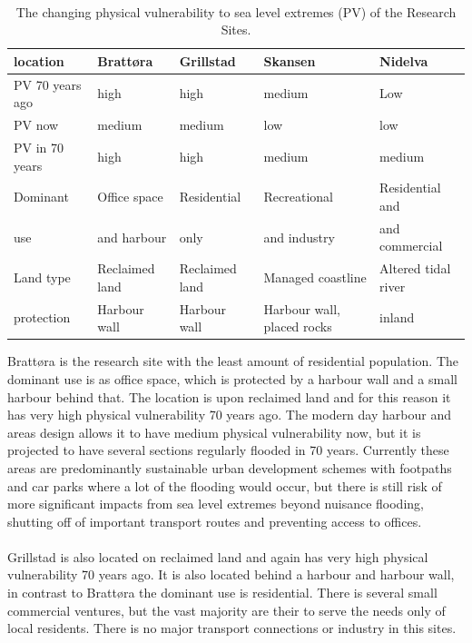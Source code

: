 \paragraph{}
\begin{table}[!ht]
    \centering
    \begin{tabular}{|l|l|l|l|l|}
    \hline
        location & Brattøra & Grillstad & Skansen  & Nidelva \\ \hline
        PV 70 years ago & high & high & medium & Low \\ \hline
        PV now &  medium &  medium &  low &  low \\ \hline
        PV in 70 years &  high &  high &  medium &  medium \\ \hline
        Dominant & Office space  & Residential & Recreational  & Residential and \\ \newline
        use & and harbour &  only   &  and industry & and commercial  \\ \hline
        Land type & Reclaimed land & Reclaimed land & Managed coastline  & Altered tidal river \\ \hline
        protection & Harbour wall & Harbour wall & Harbour wall, placed rocks & inland \\ \hline
    \end{tabular}
    \caption{The changing physical vulnerability to sea level extremes (PV) of the Research Sites.}
    \label{table:research-sites}
\end{table}

Brattøra is the research site with the least amount of residential population. The dominant use is as office space, which is protected by a harbour wall and a small harbour behind that. The location is upon reclaimed land and for this reason it has very high physical vulnerability 70 years ago. The modern day harbour and areas design allows it to have medium physical vulnerability now, but it is projected to have several sections regularly flooded in 70 years. Currently these areas are predominantly sustainable urban development schemes with footpaths and car parks where a lot of the flooding would occur, but there is still risk of more significant impacts from sea level extremes beyond nuisance flooding, shutting off of important transport routes and preventing access to offices.
\paragraph{}
Grillstad is also located on reclaimed land and again has very high physical vulnerability 70 years ago. It is also located behind a harbour and harbour wall, in contrast to  Brattøra the dominant use is residential. There is several small commercial ventures, but the vast majority are their to serve the needs only of local residents. There is no major transport connections or industry in this sites. 

